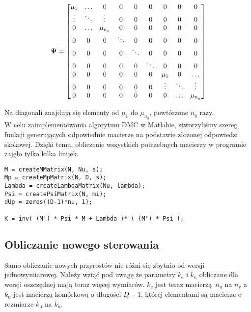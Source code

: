 \[
\bf{} \Psi \/ =
\begin{bmatrix}
    \mu_{1} & \hdots & 0 & 0 & 0 & 0 & 0 & 0 & 0\\
    \vdots & \ddots & \vdots & 0 & 0 & 0 & 0 & 0 & 0  \\
    0 & \hdots & \mu_{n_{y}} & 0 & 0 & 0 & 0 & 0 & 0 \\
    0 & 0 & 0 & \ddots & 0 & 0 & 0 & 0 & 0 \\
    0 & 0 & 0 & 0 & \ddots & 0 & 0 & 0 & 0 \\
    0 & 0 & 0 & 0 & 0 & \ddots & 0 & 0 & 0 \\
    0 & 0 & 0 & 0 & 0 & 0 & \mu_{1} & 0  & \hdots  \\
    0 & 0 & 0 & 0 & 0 & 0 & \vdots & \ddots & \vdots \\
    0 & 0 & 0 & 0 & 0 & 0 & 0 & \hdots & \mu_{n_{y}}\\
\end{bmatrix}
\]

Na diagonali znajdują się elementy od $\mu_{1}$ do $\mu_{n_{y}}$, powtórzone $n_{y}$
razy.\\

W celu zaimplementowania algorytmu DMC w Matlabie, stworzyliśmy szereg funkcji generujących 
odpowiednie macierze na podstawie złożonej odpowiedzi skokowej. Dzięki temu, obliczenie 
wszystkich potrzebnych macierzy w programie zajęło tylko kilka linijek.
\begin{lstlisting}[style=custommatlab,frame=single,label={pro_pid_parametry},caption={Obliczenie macierzy \textbf{K} regulatora DMC},captionpos=b]
%% Generacja macierzy algorytmu DMC
M = createMMatrix(N, Nu, s);
Mp = createMpMatrix(N, D, s);
Lambda = createLambdaMatrix(Nu, lambda);
Psi = createPsiMatrix(N, mi);
dUp = zeros((D-1)*nu, 1);
    
K = inv( (M') * Psi * M + Lambda )* ( (M') * Psi );
\end{lstlisting}

\subsection{Obliczanie nowego sterowania}

Samo obliczanie nowych przyrostów nie różni się zbytnio od wersji jednowymiarowej. Należy wziąć pod uwagę 
że parametry $k_{\mathrm{e}}$ i $k_{\mathrm{u}}$ obliczane dla wersji oszczędnej mają teraz więcej wymiarów.
$k_{\mathrm{e}}$ jest teraz macierzą $n_{\mathrm{u}}$ na $n_{\mathrm{y}}$ a $k_{\mathrm{u}}$ jest 
macierzą komórkową o długości $D-1$, której elementami są macierze o rozmiarze $k_{\mathrm{u}}$ na 
$k_{\mathrm{u}}$. 
\newpage

